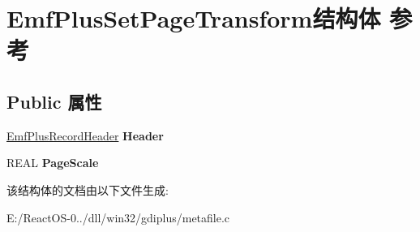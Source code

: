 \hypertarget{struct_emf_plus_set_page_transform}{}\section{Emf\+Plus\+Set\+Page\+Transform结构体 参考}
\label{struct_emf_plus_set_page_transform}
\subsection*{Public 属性}
\begin{DoxyCompactItemize}
\item 
\mbox{\label{struct_emf_plus_set_page_transform_a4fc1a04945b58f2dd6940111b11fb76d}} 
\hyperlink{struct_emf_plus_record_header}{Emf\+Plus\+Record\+Header} {\bfseries Header}
\item 
\mbox{\label{struct_emf_plus_set_page_transform_a514e4ea63a0e3bdf36fb23552450da2c}} 
R\+E\+AL {\bfseries Page\+Scale}
\end{DoxyCompactItemize}


该结构体的文档由以下文件生成\+:\begin{DoxyCompactItemize}
\item 
E\+:/\+React\+O\+S-\/0../dll/win32/gdiplus/metafile.\+c\end{DoxyCompactItemize}
